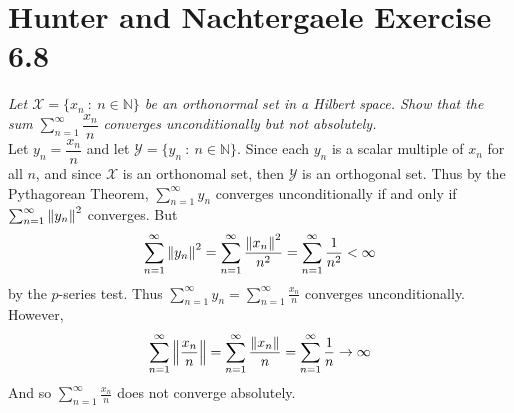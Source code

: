 \documentclass[12pt]{article}
\newcommand{\E}{\varepsilon}
\theoremstyle{plain}
\begin{document}

\section*{Hunter and Nachtergaele Exercise 6.8}
\emph{Let $\mathcal{X} = \{x_n\ :\ n \in \mathbb{N}\}$ be an orthonormal set in a Hilbert space.  Show that the sum $\displaystyle\sum_{n=1}^\infty \dfrac{x_n}{n}$ converges unconditionally but not absolutely.} \\

Let $y_n = \dfrac{x_n}{n}$ and let $\mathcal{Y} = \{y_n\ :\ n \in \mathbb{N}\}$.  Since each $y_n$ is a scalar multiple of $x_n$ for all $n$, and since $\mathcal{X}$ is an orthonomal set, then $\mathcal{Y}$ is an orthogonal set.  Thus by the Pythagorean Theorem, $\sum_{n=1}^\infty y_n$ converges unconditionally if and only if $\sum_{n=1}^\infty \norm{y_n}^2$ converges.  But
\begin{align*}
    \sum_{n=1}^\infty \norm{y_n}^2 = \sum_{n=1}^\infty \frac{\norm{x_n}^2}{n^2} = \sum_{n=1}^\infty \frac{1}{n^2} < \infty
\end{align*}
by the $p$-series test.  Thus $\sum_{n=1}^\infty y_n = \sum_{n=1}^\infty\frac{x_n}{n}$ converges unconditionally.  However,
\begin{align*}
    \sum_{n=1}^\infty \norm{\frac{x_n}{n}} = \sum_{n=1}^\infty \frac{\norm{x_n}}{n} = \sum_{n=1}^\infty \frac{1}{n} \rightarrow \infty
\end{align*}
And so $\sum_{n=1}^\infty \frac{x_n}{n}$ does not converge absolutely.
\end{document}
